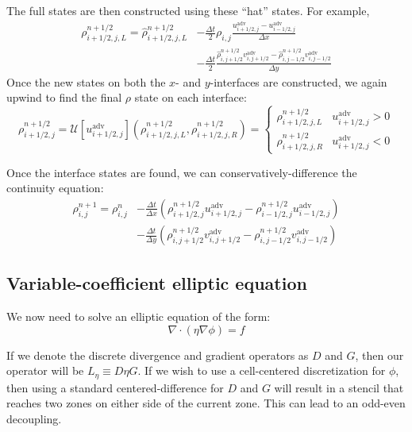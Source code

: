 The full states are then constructed using these ``hat'' states.  For example,
\begin{align}
\rho_{i+1/2,j,L}^{n+1/2} = \hat{\rho}_{i+1/2,j,L}^{n+1/2} 
   &- \frac{\Delta t}{2} \rho_{i,j} 
     \frac{u^\mathrm{adv}_{i+1/2,j} - u^\mathrm{adv}_{i-1/2,j}}{\Delta x} \nonumber \\
   &- \frac{\Delta t}{2} 
        \frac{\hat{\rho}_{i,j+1/2}^{n+1/2} v^\mathrm{adv}_{i,j+1/2} -
              \hat{\rho}_{i,j-1/2}^{n+1/2} v^\mathrm{adv}_{i,j-1/2}}{\Delta y}
\end{align}
Once the new states on both the $x$- and $y$-interfaces are constructed, we
again upwind to find the final $\rho$ state on each interface:
\begin{equation}
\rho_{i+1/2,j}^{n+1/2} = 
   \mathcal{U}[u^\mathrm{adv}_{i+1/2,j}](\rho_{i+1/2,j,L}^{n+1/2},
                                     \rho_{i+1/2,j,R}^{n+1/2}) =
  \left \{
  \begin{array}{cl}
     \rho_{i+1/2,j,L}^{n+1/2} & u^\mathrm{adv}_{i+1/2,j} > 0 \\
     \rho_{i+1/2,j,R}^{n+1/2} & u^\mathrm{adv}_{i+1/2,j} < 0 
  \end{array} \right .
\end{equation}

Once the interface states are found, we can conservatively-difference
the continuity equation:
\begin{align}
\rho^{n+1}_{i,j} = \rho^n_{i,j} 
   &- \frac{\Delta t}{\Delta x} 
      \left (\rho_{i+1/2,j}^{n+1/2} u^\mathrm{adv}_{i+1/2,j} -
             \rho_{i-1/2,j}^{n+1/2} u^\mathrm{adv}_{i-1/2,j} \right ) \nonumber \\
   &- \frac{\Delta t}{\Delta y}
      \left (\rho_{i,j+1/2}^{n+1/2} v^\mathrm{adv}_{i,j+1/2} -
             \rho_{i,j-1/2}^{n+1/2} v^\mathrm{adv}_{i,j-1/2} \right )
\end{align}

\subsection{Variable-coefficient elliptic equation}

\label{sec:lm:vcelliptic}

We now need to solve an elliptic equation of the form:
\begin{equation}
\nabla \cdot (\eta \nabla \phi) = f
\end{equation}

If we denote the discrete divergence and gradient operators as $D$ and $G$,
then our operator will be $L_\eta \equiv D \eta G$.  If we wish to
use a cell-centered discretization for $\phi$, then using a standard 
centered-difference for $D$ and $G$ will result in a stencil that reaches
two zones on either side of the current zone.  This can lead to an
odd-even decoupling. 

